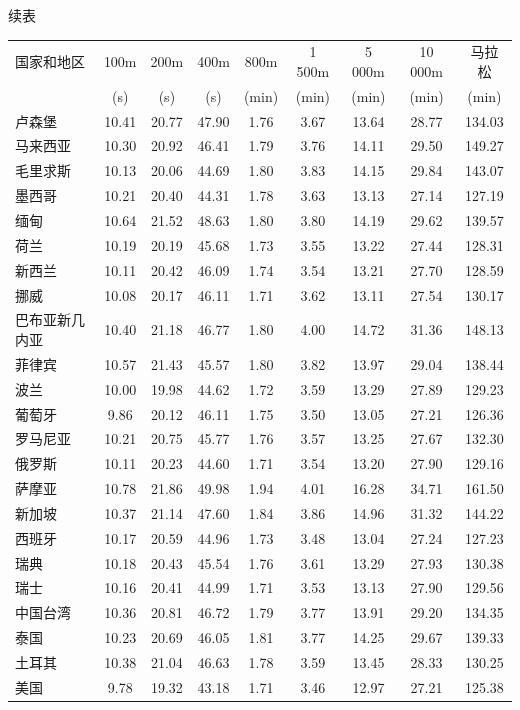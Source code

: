 
\noindent\hfill 续表

\begin{mvtable}
\begin{tabular}{lcccccccc}
\toprule
国家和地区 & 100m & 200m & 400m & 800m & 1 500m & 5 000m & 10 000m & 马拉松 \\
 & (s) & (s) & (s) & (min) & (min) & (min) & (min) & (min) \\
\midrule
卢森堡 & 10.41 & 20.77 & 47.90 & 1.76 & 3.67 & 13.64 & 28.77 & 134.03 \\
马来西亚 & 10.30 & 20.92 & 46.41 & 1.79 & 3.76 & 14.11 & 29.50 & 149.27 \\
毛里求斯 & 10.13 & 20.06 & 44.69 & 1.80 & 3.83 & 14.15 & 29.84 & 143.07 \\
墨西哥 & 10.21 & 20.40 & 44.31 & 1.78 & 3.63 & 13.13 & 27.14 & 127.19 \\
缅甸 & 10.64 & 21.52 & 48.63 & 1.80 & 3.80 & 14.19 & 29.62 & 139.57 \\
荷兰 & 10.19 & 20.19 & 45.68 & 1.73 & 3.55 & 13.22 & 27.44 & 128.31 \\
新西兰 & 10.11 & 20.42 & 46.09 & 1.74 & 3.54 & 13.21 & 27.70 & 128.59 \\
挪威 & 10.08 & 20.17 & 46.11 & 1.71 & 3.62 & 13.11 & 27.54 & 130.17 \\
巴布亚新几内亚 & 10.40 & 21.18 & 46.77 & 1.80 & 4.00 & 14.72 & 31.36 & 148.13 \\
菲律宾 & 10.57 & 21.43 & 45.57 & 1.80 & 3.82 & 13.97 & 29.04 & 138.44 \\
波兰 & 10.00 & 19.98 & 44.62 & 1.72 & 3.59 & 13.29 & 27.89 & 129.23 \\
葡萄牙 & 9.86 & 20.12 & 46.11 & 1.75 & 3.50 & 13.05 & 27.21 & 126.36 \\
罗马尼亚 & 10.21 & 20.75 & 45.77 & 1.76 & 3.57 & 13.25 & 27.67 & 132.30 \\
俄罗斯 & 10.11 & 20.23 & 44.60 & 1.71 & 3.54 & 13.20 & 27.90 & 129.16 \\
萨摩亚 & 10.78 & 21.86 & 49.98 & 1.94 & 4.01 & 16.28 & 34.71 & 161.50 \\
新加坡 & 10.37 & 21.14 & 47.60 & 1.84 & 3.86 & 14.96 & 31.32 & 144.22 \\
西班牙 & 10.17 & 20.59 & 44.96 & 1.73 & 3.48 & 13.04 & 27.24 & 127.23 \\
瑞典 & 10.18 & 20.43 & 45.54 & 1.76 & 3.61 & 13.29 & 27.93 & 130.38 \\
瑞士 & 10.16 & 20.41 & 44.99 & 1.71 & 3.53 & 13.13 & 27.90 & 129.56 \\
中国台湾 & 10.36 & 20.81 & 46.72 & 1.79 & 3.77 & 13.91 & 29.20 & 134.35 \\
泰国 & 10.23 & 20.69 & 46.05 & 1.81 & 3.77 & 14.25 & 29.67 & 139.33 \\
土耳其 & 10.38 & 21.04 & 46.63 & 1.78 & 3.59 & 13.45 & 28.33 & 130.25 \\
美国 & 9.78 & 19.32 & 43.18 & 1.71 & 3.46 & 12.97 & 27.21 & 125.38 \\
\bottomrule
\end{tabular}
\end{mvtable}

